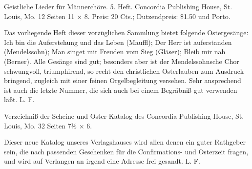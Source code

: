 Geistliche Lieder für Männerchöre. 5. Heft. Concordia Publishing House, St. Louis, Mo. 12 Seiten 11 × 8. Preis: 20 Cts.; Dutzendpreis: \$1.50 und Porto.

Das vorliegende Heft dieser vorzüglichen Sammlung bietet folgende Ostergesänge: Ich bin die Auferstehung und das Leben (Mauffl); Der Herr ist auferstanden (Mendelssohn); Man singet mit Freuden vom Sieg (Gläser); Bleib mir nah (Berner). Alle Gesänge sind gut; besonders aber ist der Mendelssohnsche Chor schwungvoll, triumphirend, so recht den christlichen Osterlauben zum Ausdruck bringend, zugleich mit einer feinen Orgelbegleitung versehen. Sehr ansprechend ist auch die letzte Nummer, die sich auch bei einem Begräbniß gut verwenden läßt. L. F.

Verzeichniß der Scheine und Oster-Katalog des Concordia Publishing House, St. Louis, Mo. 32 Seiten 7½ × 6.

Dieser neue Katalog unseres Verlagshauses wird allen denen ein guter Rathgeber sein, die nach passenden Geschenken für die Confirmations- und Osterzeit fragen, und wird auf Verlangen an irgend eine Adresse frei gesandt. L. F.
